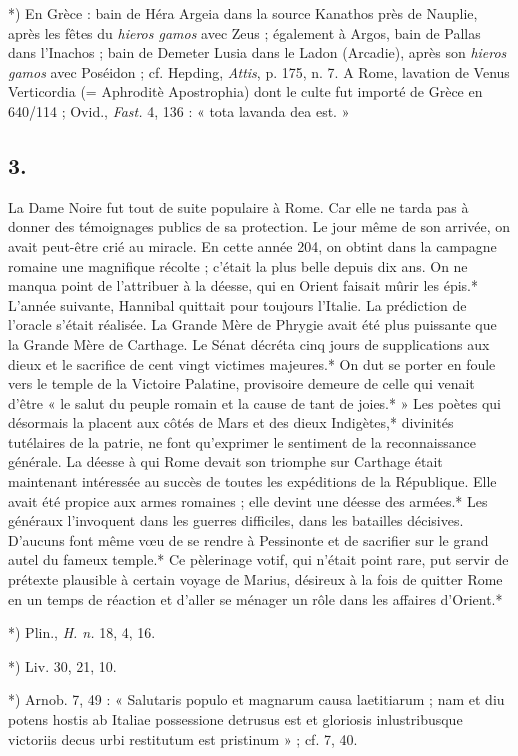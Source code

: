 \documentclass[a4paper, 11pt, oneside, polutonikogreek, french]{article}
\begin{document}
*) En Grèce : bain de Héra Argeia dans la source Kanathos près de Nauplie, après les fêtes du \emph{hieros gamos} avec Zeus ; également à Argos, bain de Pallas dans l'Inachos ; bain de Demeter Lusia dans le Ladon (Arcadie), après son \emph{hieros gamos} avec Poséidon ; cf. Hepding, \emph{Attis}, p. 175, n. 7. A Rome, lavation de Venus Verticordia (= Aphroditè Apostrophia) dont le culte fut importé de Grèce en 640/114 ; Ovid., \emph{Fast.} 4, 136 : « tota lavanda dea est. »

\subsection{3.}

La Dame Noire fut tout de suite populaire à Rome. Car elle ne tarda pas à donner des témoignages publics de sa protection. Le jour même de son arrivée, on avait peut-être crié au miracle. En cette année 204, on obtint dans la campagne romaine une magnifique récolte ; c'était la plus belle depuis dix ans. On ne manqua point de l'attribuer à la déesse, qui en Orient faisait mûrir les épis.* L'année suivante, Hannibal quittait pour toujours l'Italie. La prédiction de l'oracle s'était réalisée. La Grande Mère de Phrygie avait été plus puissante que la Grande Mère de Carthage. Le Sénat décréta cinq jours de supplications aux dieux et le sacrifice de cent vingt victimes majeures.* On dut se porter en foule vers le temple de la Victoire Palatine, provisoire demeure de celle qui venait d'être « le salut du peuple romain et la cause de tant de joies.* » Les poètes qui désormais la placent aux côtés de Mars et des dieux Indigètes,* divinités tutélaires de la patrie, ne font qu'exprimer le sentiment de la reconnaissance générale. La déesse à qui Rome devait son triomphe sur Carthage était maintenant intéressée au succès de toutes les expéditions de la République. Elle avait été propice aux armes romaines ; elle devint une déesse des armées.* Les généraux l'invoquent dans les guerres difficiles, dans les batailles décisives. D'aucuns font même vœu de se rendre à Pessinonte et de sacrifier sur le grand autel du fameux temple.* Ce pèlerinage votif, qui n'était point rare, put servir de prétexte plausible à certain voyage de Marius, désireux à la fois de quitter Rome en un temps de réaction et d'aller se ménager un rôle dans les affaires d'Orient.*

*) Plin., \emph{H. n.} 18, 4, 16.

*) Liv. 30, 21, 10.

*) Arnob. 7, 49 : « Salutaris populo et magnarum causa laetitiarum ; nam et diu potens hostis ab Italiae possessione detrusus est et gloriosis inlustribusque victoriis decus urbi restitutum est pristinum » ; cf. 7, 40.
\end{document}
